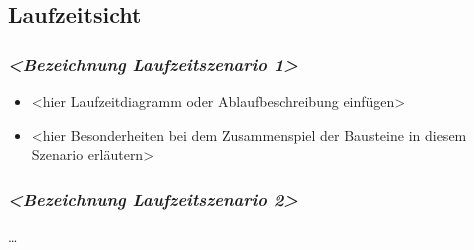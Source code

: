 







\subsection{Laufzeitsicht}\label{section-runtime-view}

\subsubsection{\texorpdfstring{\emph{\textless{}Bezeichnung
Laufzeitszenario
1\textgreater{}}}{\textless{}Bezeichnung Laufzeitszenario 1\textgreater{}}}\label{__emphasis_bezeichnung_laufzeitszenario_1_emphasis}

\begin{itemize}
\item
  \textless{}hier Laufzeitdiagramm oder Ablaufbeschreibung
  einfügen\textgreater{}
\item
  \textless{}hier Besonderheiten bei dem Zusammenspiel der Bausteine in
  diesem Szenario erläutern\textgreater{}
\end{itemize}

\subsubsection{\texorpdfstring{\emph{\textless{}Bezeichnung
Laufzeitszenario
2\textgreater{}}}{\textless{}Bezeichnung Laufzeitszenario 2\textgreater{}}}\label{__emphasis_bezeichnung_laufzeitszenario_2_emphasis}

\ldots{}


